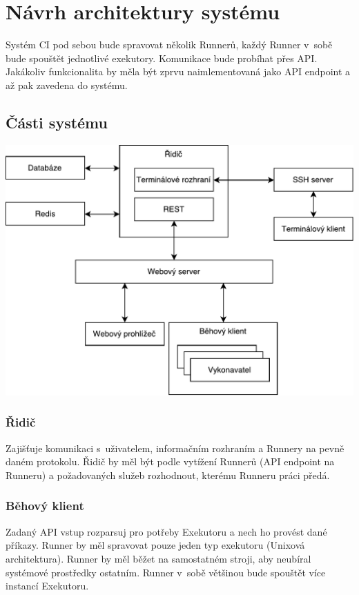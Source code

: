 \chapter{Návrh architektury systému}

Systém CI pod sebou bude spravovat několik Runnerů, každý Runner v~sobě bude spouštět jednotlivé exekutory.
Komunikace bude probíhat přes API.
Jakákoliv funkcionalita by měla být zprvu naimlementovaná jako API endpoint a až pak zavedena do systému.

\section{Části systému}

\includegraphics[max width=\linewidth]{architektura_piper.pdf}

\subsection{Řidič}

Zajišťuje komunikaci s~uživatelem, informačním rozhraním a Runnery na pevně daném protokolu.
Řidič by měl být podle vytížení Runnerů (API endpoint na Runneru) a požadovaných služeb rozhodnout, kterému Runneru práci předá.

\subsection{Běhový klient}

Zadaný API vstup rozparsuj pro potřeby Exekutoru a nech ho provést dané příkazy.
Runner by měl spravovat pouze jeden typ exekutoru (Unixová architektura).
Runner by měl běžet na samostatném stroji, aby neubíral systémové prostředky ostatním.
Runner v~sobě většinou bude spouštět více instancí Exekutoru.

